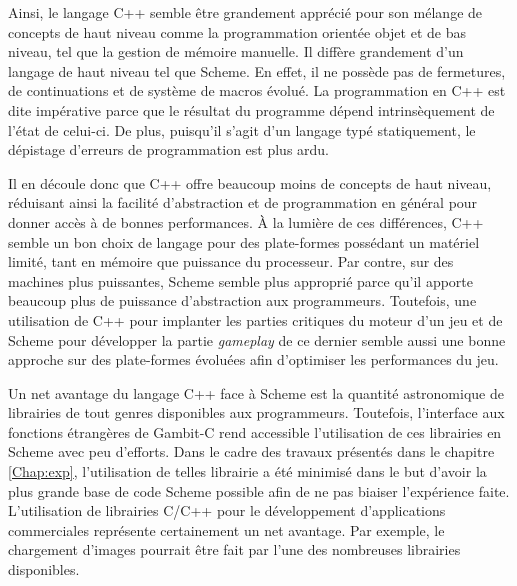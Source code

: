 \documentclass[12pt,twoside,letterpaper,francais]{book}
\begin{document}
Ainsi, le langage C++ semble être grandement apprécié pour son mélange
de concepts de haut niveau comme la programmation orientée objet et de
bas niveau, tel que la gestion de mémoire manuelle. Il diffère
grandement d'un langage de haut niveau tel que Scheme. En effet,
il ne possède pas de fermetures, de continuations et de système de
macros évolué. La programmation en C++ est dite impérative parce que
le résultat du programme dépend intrinsèquement de l'état de
celui-ci. De plus, puisqu'il s'agit d'un langage typé statiquement, le
dépistage d'erreurs de programmation est plus ardu.

Il en découle donc que C++ offre beaucoup moins de concepts de haut
niveau, réduisant ainsi la facilité d'abstraction et de programmation
en général pour donner accès à de bonnes performances. À la lumière de
ces différences, C++ semble un bon choix de langage pour des
plate-formes possédant un matériel limité, tant en mémoire que
puissance du processeur. Par contre, sur des machines plus puissantes,
Scheme semble plus approprié parce qu'il apporte beaucoup plus de
puissance d'abstraction aux programmeurs. Toutefois, une utilisation
de C++ pour implanter les parties critiques du moteur d'un jeu et de
Scheme pour développer la partie \textit{gameplay} de ce dernier
semble aussi une bonne approche sur des plate-formes évoluées afin
d'optimiser les performances du jeu.

Un net avantage du langage C++ face à Scheme est la quantité
astronomique de librairies de tout genres disponibles aux
programmeurs. Toutefois, l'interface aux fonctions étrangères de
Gambit-C rend accessible l'utilisation de ces librairies en Scheme
avec peu d'efforts. Dans le cadre des travaux présentés dans le
chapitre \ref{Chap:exp}, l'utilisation de telles librairie a été
minimisé dans le but d'avoir la plus grande base de code Scheme
possible afin de ne pas biaiser l'expérience faite. L'utilisation de
librairies C/C++ pour le dévelop\-pement d'applications commerciales
représente certainement un net avantage. Par exemple, le chargement
d'images pourrait être fait par l'une des nombreuses librairies
disponibles.
\end{document}
